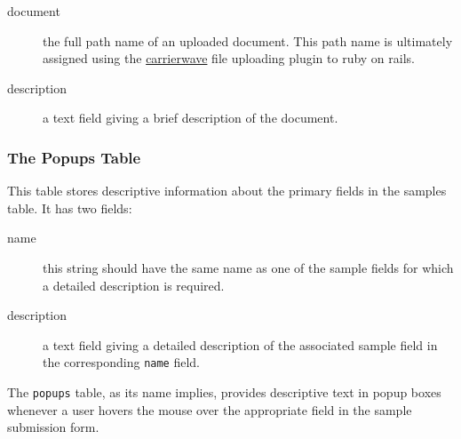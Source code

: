 \documentclass[12pt]{article}
\begin{document}
\begin{description}
\item[document]
the full path name of an uploaded document. This path name is ultimately
assigned using the 
\href{https://github.com/jnicklas/carrierwave}{carrierwave}
file uploading plugin to ruby on rails.
\item[description]
a text field giving a brief description of the document.
\end{description}

\subsubsection{The Popups Table}
This table stores descriptive information about the primary fields
in the samples table. It has two fields:

\begin{description}
\item[name]
this string should have the same name as one of the sample fields for
which a detailed description is required.
\item[description]
a text field giving a detailed description of the associated sample field
in the corresponding \verb=name= field.
\end{description}

The \verb=popups= table, as its name implies, provides descriptive
text in popup boxes whenever a user hovers the mouse over the
appropriate field in the sample submission form.
\end{document}
